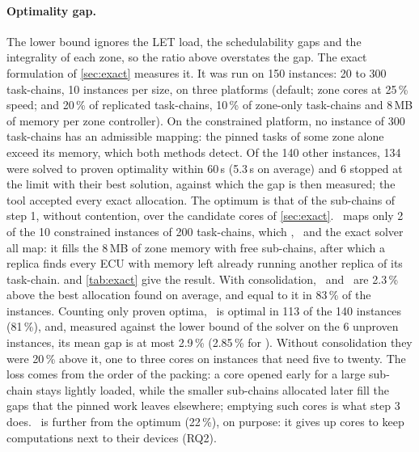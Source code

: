 \paragraph{Optimality gap.} The lower bound ignores the LET load, the
schedulability gaps and the integrality of each zone, so the ratio above
overstates the gap. The exact formulation of \cref{sec:exact} measures it.
It was run on 150 instances: 20 to 300 task-chains, 10 instances per
size, on three platforms (default; zone cores at 25\,\% speed; and 20\,\%
of replicated task-chains, 10\,\% of zone-only task-chains and 8\,MB of
memory per zone controller). On the constrained platform, no instance of
300 task-chains has an admissible mapping: the pinned tasks of some zone
alone exceed its memory, which both methods detect. Of the 140 other
instances, 134 were solved to proven optimality within 60\,s (5.3\,s on
average) and 6 stopped at the limit with their best solution, against
which the gap is then measured; the tool accepted every exact allocation.
The optimum is that of the sub-chains of step 1, without contention, over
the candidate cores of \cref{sec:exact}. \CADU\ maps only 2 of the 10
constrained instances of 200 task-chains, which \BFDU, \FFDU\ and the
exact solver all map: it fills the 8\,MB of zone memory with free
sub-chains, after which a replica finds every ECU with memory left
already running another replica of its task-chain. 
and \cref{tab:exact} give the result. With consolidation, \BFDU\ and
\FFDU\ are 2.3\,\% above the best allocation found on average, and equal
to it in 83\,\% of the instances. Counting only proven optima, \BFDU\ is
optimal in 113 of the 140 instances (81\,\%), and, measured against the
lower bound of the solver on the 6 unproven instances, its mean gap is at
most 2.9\,\% (2.85\,\% for \FFDU). Without consolidation they were 20\,\% above it, one to
three cores on instances that need five to twenty. The loss comes from
the order of the packing: a core opened early for a large sub-chain stays
lightly loaded, while the smaller sub-chains allocated later fill the
gaps that the pinned work leaves elsewhere; emptying such cores is what
step 3 does. \CADU\ is further from the optimum (22\,\%), on purpose: it
gives up cores to keep computations next to their devices (RQ2).

